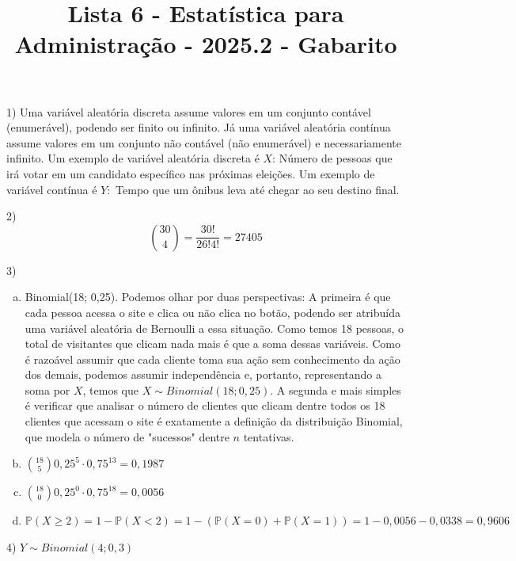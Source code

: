 \documentclass[12pt]{article}
\title{Lista 6 - Estatística para Administração - 2025.2 - Gabarito}
\begin{document}
\date{}
\maketitle

1) Uma variável aleatória discreta assume valores em um conjunto contável (enumerável), podendo ser finito ou infinito. Já uma variável aleatória 
contínua assume valores em um conjunto não contável (não enumerável) e necessariamente infinito. Um exemplo de variável aleatória discreta é $X$: Número de pessoas 
que irá votar em um candidato específico nas próximas eleições. Um exemplo de variável contínua é $Y:$ Tempo que um ônibus leva até chegar ao seu 
destino final.  


\vspace{3px}

2) $$\binom{30}{4} = \dfrac{30!}{26!4!} = 27405$$

\vspace{3px}

3) 

    \begin{enumerate}[a)]
        \item Binomial(18; 0,25). Podemos olhar por duas perspectivas: A primeira é que cada pessoa acessa o site e clica ou não clica no botão, podendo 
        ser atribuída uma variável aleatória de Bernoulli a essa situação. Como temos 18 pessoas, o total de visitantes que clicam nada mais é 
        que a soma dessas variáveis. Como é razoável assumir que cada cliente toma sua ação sem conhecimento da ação dos demais, podemos 
        assumir independência e, portanto, representando a soma por $X$, temos que $X \sim Binomial(18; 0,25)$. A segunda e mais simples é verificar que 
        analisar o número de clientes que clicam dentre todos os 18 clientes que acessam o site é exatamente a definição da distribuição Binomial, que 
        modela o número de "sucessos" dentre $n$ tentativas. 
        \item $\binom{18}{5} 0,25^5 \cdot 0,75^{13} = 0,1987$
        \item $\binom{18}{0} 0,25^0 \cdot 0,75^{18} = 0,0056$
        \item $\mathds{P}(X \geq 2) = 1 -\mathds{P}(X<2) =1 - ( \mathds{P}(X=0) + \mathds{P}(X=1)) =  1- 0,0056 - 0,0338 = 0,9606$
    \end{enumerate}

\vspace{3px}

4) $Y \sim Binomial(4; 0,3)$
\end{document}
